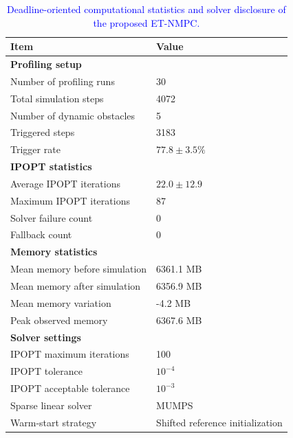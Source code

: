 \documentclass[lettersize,journal]{IEEEtran}
\begin{document}
\begin{table}[h]
	\centering
	\caption{\textcolor{blue}{Deadline-oriented computational statistics and solver disclosure of the proposed ET-NMPC.}}
	\label{tab:computational_profiling}
	\scriptsize
	\setlength{\tabcolsep}{2.5pt}
	\renewcommand{\arraystretch}{1.12}
	\begin{tabular}{p{}p{}}
		\toprule
		\textbf{Item} & \textbf{Value} \\
		\midrule
		\multicolumn{2}{l}{\textbf{Profiling setup}} \\
		Number of profiling runs & 30 \\
		Total simulation steps & 4072 \\
		Number of dynamic obstacles & 5 \\
		Triggered steps & 3183 \\
		Trigger rate & $77.8 \pm 3.5\%$ \\
		\midrule
		\multicolumn{2}{l}{\textbf{IPOPT statistics}} \\
		Average IPOPT iterations & $22.0 \pm 12.9$ \\
		Maximum IPOPT iterations & 87 \\
		Solver failure count & 0 \\
		Fallback count & 0 \\
		\midrule
		\multicolumn{2}{l}{\textbf{Memory statistics}} \\
		Mean memory before simulation & 6361.1 MB \\
		Mean memory after simulation & 6356.9 MB \\
		Mean memory variation & -4.2 MB \\
		Peak observed memory & 6367.6 MB \\
		\midrule
		\multicolumn{2}{l}{\textbf{Solver settings}} \\
		IPOPT maximum iterations & 100 \\
		IPOPT tolerance & $10^{-4}$ \\
		IPOPT acceptable tolerance & $10^{-3}$ \\
		Sparse linear solver & MUMPS \\
		Warm-start strategy & Shifted reference initialization \\
		\bottomrule
	\end{tabular}


\end{table}
\end{document}
